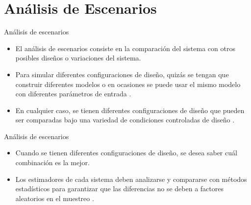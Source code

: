 \section{Análisis de Escenarios}

\begin{frame}{Análisis de escenarios}
    \begin{itemize}
        \item El análisis de escenarios consiste en la comparación del sistema con otros posibles diseños o variaciones del sistema.
        \item Para simular diferentes configuraciones de diseño, quizás se tengan que construir diferentes modelos o en ocasiones se puede usar el mismo modelo con diferentes parámetros de entrada \cite{rossetti}.
        \item En cualquier caso, se tienen diferentes configuraciones de diseño que pueden ser comparadas bajo una variedad de condiciones controladas de diseño \cite{rossetti}.
    \end{itemize}
\end{frame}


\begin{frame}{Análisis de escenarios}
    \begin{itemize}
        \item Cuando se tienen diferentes configuraciones de diseño, se desea saber cuál combinación es la mejor.
        \item Los estimadores de cada sistema deben analizarse y compararse con métodos estadísticos para garantizar que las diferencias no se deben a factores aleatorios en el muestreo \cite{BCN}.
    \end{itemize}
\end{frame}

